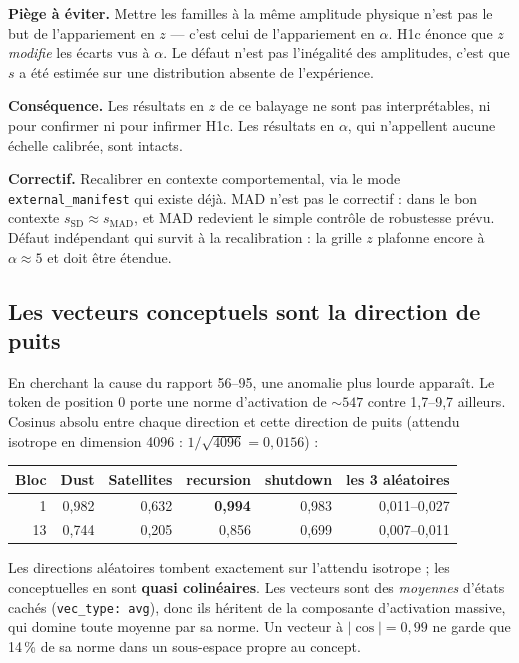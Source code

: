 \documentclass[a4paper,10pt]{article}
\newcommand{\pc}[1]{#1\,\%}
\begin{document}
\textbf{Piège à éviter.} \og Mettre les familles à la même amplitude physique\fg{} n'est pas le but
de l'appariement en $z$ --- c'est celui de l'appariement en $\alpha$. H1c énonce que $z$
\emph{modifie} les écarts vus à $\alpha$. Le défaut n'est pas l'inégalité des amplitudes, c'est que
$s$ a été estimée sur une distribution absente de l'expérience.

\textbf{Conséquence.} Les résultats en $z$ de ce balayage ne sont pas interprétables, ni pour
confirmer ni pour infirmer H1c. Les résultats en $\alpha$, qui n'appellent aucune échelle calibrée,
sont intacts.

\textbf{Correctif.} Recalibrer en contexte comportemental, via le mode \texttt{external\_manifest}
qui existe déjà. MAD n'est pas le correctif : dans le bon contexte $s_{\mathrm{SD}} \approx
s_{\mathrm{MAD}}$, et MAD redevient le simple contrôle de robustesse prévu. Défaut indépendant qui
survit à la recalibration : la grille $z$ plafonne encore à $\alpha \approx 5$ et doit être étendue.

\subsection{Les vecteurs conceptuels sont la direction de puits}

En cherchant la cause du rapport 56--95, une anomalie plus lourde apparaît. Le token de position 0
porte une norme d'activation de ${\sim}547$ contre 1,7--9,7 ailleurs. Cosinus absolu entre chaque
direction et cette direction de puits (attendu isotrope en dimension 4096 : $1/\sqrt{4096}=0{,}0156$) :

\begin{center}\small
\begin{tabular}{rrrrrr}
\toprule
Bloc & Dust & Satellites & recursion & shutdown & les 3 aléatoires \\
\midrule
1  & 0,982 & 0,632 & \textbf{0,994} & 0,983 & 0,011--0,027 \\
13 & 0,744 & 0,205 & 0,856 & 0,699 & 0,007--0,011 \\
\bottomrule
\end{tabular}
\end{center}

Les directions aléatoires tombent exactement sur l'attendu isotrope ; les conceptuelles en sont
\textbf{quasi colinéaires}. Les vecteurs sont des \emph{moyennes} d'états cachés
(\texttt{vec\_type: avg}), donc ils héritent de la composante d'activation massive, qui domine toute
moyenne par sa norme. Un vecteur à $|\cos| = 0{,}99$ ne garde que \pc{14} de sa norme dans un
sous-espace propre au concept.
\end{document}

